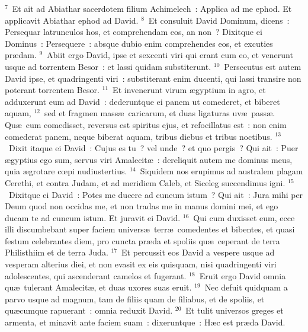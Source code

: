 ${}^{7}$~Et ait ad Abiathar sacerdotem filium Achimelech~: Applica ad me ephod. Et applicavit Abiathar ephod ad David.
${}^{8}$~Et consuluit David Dominum, dicens~: Persequar latrunculos hos, et comprehendam eos, an non~? Dixitque ei Dominus~: Persequere~: absque dubio enim comprehendes eos, et excuties pr\ae dam.
${}^{9}$~Abiit ergo David, ipse et sexcenti viri qui erant cum eo, et venerunt usque ad torrentem Besor~: et lassi quidam substiterunt.
${}^{10}$~Persecutus est autem David ipse, et quadringenti viri~: substiterant enim ducenti, qui lassi transire non poterant torrentem Besor.
${}^{11}$~Et invenerunt virum \ae gyptium in agro, et adduxerunt eum ad David~: dederuntque ei panem ut comederet, et biberet aquam,
${}^{12}$~sed et fragmen mass\ae\ caricarum, et duas ligaturas uv\ae\ pass\ae . Qu\ae\ cum comedisset, reversus est spiritus ejus, et refocillatus est~: non enim comederat panem, neque biberat aquam, tribus diebus et tribus noctibus.
${}^{13}$~Dixit itaque ei David~: Cujus es tu~? vel unde~? et quo pergis~? Qui ait~: Puer \ae gyptius ego sum, servus viri Amalecit\ae~: dereliquit autem me dominus meus, quia \ae grotare cœpi nudiustertius.
${}^{14}$~Siquidem nos erupimus ad australem plagam Cerethi, et contra Judam, et ad meridiem Caleb, et Siceleg succendimus igni.
${}^{15}$~Dixitque ei David~: Potes me ducere ad cuneum istum~? Qui ait~: Jura mihi per Deum quod non occidas me, et non tradas me in manus domini mei, et ego ducam te ad cuneum istum. Et juravit ei David.
${}^{16}$~Qui cum duxisset eum, ecce illi discumbebant super faciem univers\ae\ terr\ae\ comedentes et bibentes, et quasi festum celebrantes diem, pro cuncta pr\ae da et spoliis qu\ae\ ceperant de terra Philisthiim et de terra Juda.
${}^{17}$~Et percussit eos David a vespere usque ad vesperam alterius diei, et non evasit ex eis quisquam, nisi quadringenti viri adolescentes, qui ascenderant camelos et fugerant.
${}^{18}$~Eruit ergo David omnia qu\ae\ tulerant Amalecit\ae , et duas uxores suas eruit.
${}^{19}$~Nec defuit quidquam a parvo usque ad magnum, tam de filiis quam de filiabus, et de spoliis, et qu\ae cumque rapuerant~: omnia reduxit David.
${}^{20}$~Et tulit universos greges et armenta, et minavit ante faciem suam~: dixeruntque~: H\ae c est pr\ae da David.


